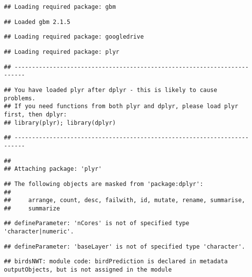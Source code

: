 \documentclass[]{article}
\begin{document}
\begin{verbatim}
## Loading required package: gbm
\end{verbatim}

\begin{verbatim}
## Loaded gbm 2.1.5
\end{verbatim}

\begin{verbatim}
## Loading required package: googledrive
\end{verbatim}

\begin{verbatim}
## Loading required package: plyr
\end{verbatim}

\begin{verbatim}
## -------------------------------------------------------------------------
\end{verbatim}

\begin{verbatim}
## You have loaded plyr after dplyr - this is likely to cause problems.
## If you need functions from both plyr and dplyr, please load plyr first, then dplyr:
## library(plyr); library(dplyr)
\end{verbatim}

\begin{verbatim}
## -------------------------------------------------------------------------
\end{verbatim}

\begin{verbatim}
## 
## Attaching package: 'plyr'
\end{verbatim}

\begin{verbatim}
## The following objects are masked from 'package:dplyr':
## 
##     arrange, count, desc, failwith, id, mutate, rename, summarise,
##     summarize
\end{verbatim}

\begin{verbatim}
## defineParameter: 'nCores' is not of specified type 'character|numeric'.
\end{verbatim}

\begin{verbatim}
## defineParameter: 'baseLayer' is not of specified type 'character'.
\end{verbatim}

\begin{verbatim}
## birdsNWT: module code: birdPrediction is declared in metadata outputObjects, but is not assigned in the module
\end{verbatim}
\end{document}
